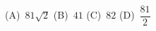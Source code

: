 \documentclass[preview]{standalone}
\begin{document}
\begin{center}
(A)\ $81\sqrt{2}$ \qquad (B)\ $41$ \qquad (C)\ $82$ \qquad (D)\ $\dfrac{81}{2}$
\end{center}
\end{document}
